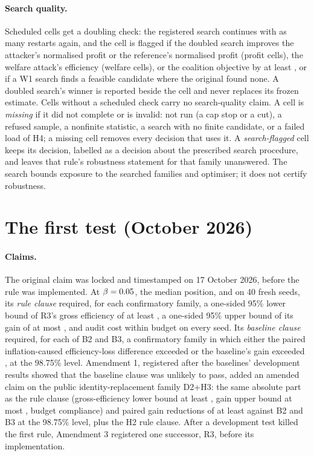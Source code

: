 \documentclass[11pt]{article}
\begin{document}
\paragraph{Search quality.} Scheduled cells get a doubling check: the registered search continues with as many restarts again, and the cell is flagged if the doubled search improves the attacker's normalised profit or the reference's normalised profit (profit cells), the welfare attack's efficiency (welfare cells), or the coalition objective by at least , or if a W1 search finds a feasible candidate where the original found none. A doubled search's winner is reported beside the cell and never replaces its frozen estimate. Cells without a scheduled check carry no search-quality claim. A cell is \emph{missing} if it did not complete or is invalid: not run (a cap stop or a cut), a refused sample, a nonfinite statistic, a search with no finite candidate, or a failed load of H4; a missing cell removes every decision that uses it. A \emph{search-flagged} cell keeps its decision, labelled as a decision about the prescribed search procedure, and leaves that rule's robustness statement for that family unanswered. The search bounds exposure to the searched families and optimiser; it does not certify robustness.

\section{The first test (October 2026)}\label{sec:eval1}
\paragraph{Claims.} The original claim was locked and timestamped on 17 October 2026, before the rule was implemented. At $\beta = 0.05$, the median position, and on 40 fresh seeds, its \emph{rule clause} required, for each confirmatory family, a one-sided 95\% lower bound of R3's gross efficiency of at least , a one-sided 95\% upper bound of its gain of at most , and audit cost within budget on every seed. Its \emph{baseline clause} required, for each of B2 and B3, a confirmatory family in which either the paired inflation-caused efficiency-loss difference exceeded  or the baseline's gain exceeded , at the 98.75\% level. Amendment 1, registered after the baselines' development results showed that the baseline clause was unlikely to pass, added an amended claim on the public identity-replacement family D2+H3: the same absolute part as the rule clause (gross-efficiency lower bound at least , gain upper bound at most , budget compliance) and paired gain reductions of at least  against B2 and B3 at the 98.75\% level, plus the H2 rule clause. After a development test killed the first rule, Amendment 3 registered one successor, R3, before its implementation.
\end{document}
